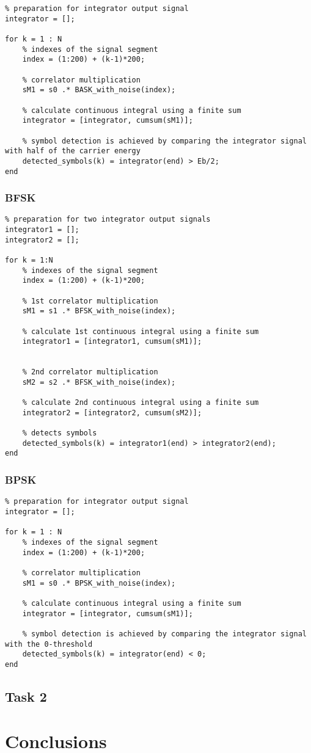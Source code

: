 \begin{lstlisting}
% preparation for integrator output signal 
integrator = []; 

for k = 1 : N
    % indexes of the signal segment
    index = (1:200) + (k-1)*200;

    % correlator multiplication 
    sM1 = s0 .* BASK_with_noise(index);  

    % calculate continuous integral using a finite sum
    integrator = [integrator, cumsum(sM1)]; 

    % symbol detection is achieved by comparing the integrator signal with half of the carrier energy
    detected_symbols(k) = integrator(end) > Eb/2;
end
\end{lstlisting}

\subsubsection*{BFSK}

\begin{lstlisting}
% preparation for two integrator output signals
integrator1 = []; 
integrator2 = [];

for k = 1:N
    % indexes of the signal segment
    index = (1:200) + (k-1)*200;

    % 1st correlator multiplication 
    sM1 = s1 .* BFSK_with_noise(index);  

    % calculate 1st continuous integral using a finite sum
    integrator1 = [integrator1, cumsum(sM1)];


    % 2nd correlator multiplication 
    sM2 = s2 .* BFSK_with_noise(index);

    % calculate 2nd continuous integral using a finite sum
    integrator2 = [integrator2, cumsum(sM2)];

    % detects symbols
    detected_symbols(k) = integrator1(end) > integrator2(end);
end
\end{lstlisting}

\subsubsection*{BPSK}
\begin{lstlisting}
% preparation for integrator output signal 
integrator = [];    

for k = 1 : N
    % indexes of the signal segment
    index = (1:200) + (k-1)*200;

    % correlator multiplication 
    sM1 = s0 .* BPSK_with_noise(index);  

    % calculate continuous integral using a finite sum
    integrator = [integrator, cumsum(sM1)]; 

    % symbol detection is achieved by comparing the integrator signal with the 0-threshold
    detected_symbols(k) = integrator(end) < 0;
end
\end{lstlisting}

\subsection*{Task 2}



\section*{Conclusions}



